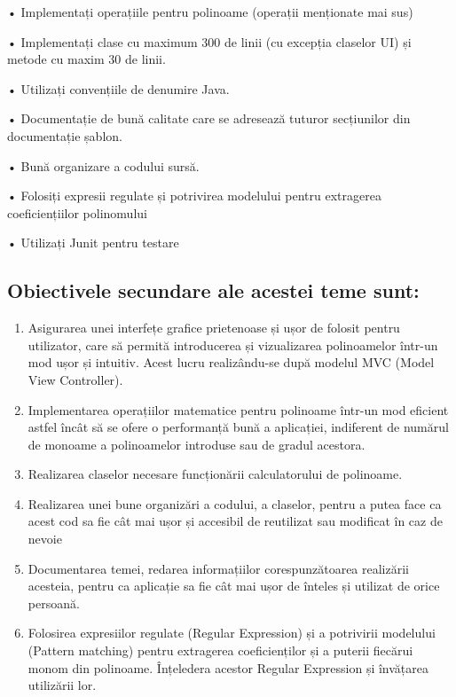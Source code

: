 \documentclass[a4paper,12pt]{article}
\begin{document}
• Implementați operațiile pentru polinoame (operații menționate mai sus)

• Implementați clase cu maximum 300 de linii (cu excepția claselor UI) și metode cu maxim 30 de linii.

• Utilizați convențiile de denumire Java.

• Documentație de bună calitate care se adresează tuturor secțiunilor din documentație șablon.

• Bună organizare a codului sursă.

• Folosiți expresii regulate și potrivirea modelului pentru extragerea coeficiențiilor polinomului

• Utilizați Junit pentru testare

\subsection{Obiectivele secundare ale acestei teme sunt:}

\begin{enumerate}
        \item Asigurarea unei interfețe grafice prietenoase și ușor de folosit pentru utilizator, care să permită introducerea și vizualizarea polinoamelor într-un mod ușor și intuitiv. Acest lucru realizându-se după modelul MVC (Model View Controller).
        \item Implementarea operațiilor matematice pentru polinoame într-un mod eficient astfel încât să se ofere o performanță bună a aplicației, indiferent de numărul de monoame a polinoamelor introduse sau de gradul acestora.
        \item Realizarea claselor necesare funcționării calculatorului de polinoame. 
        \item Realizarea unei bune organizări a codului, a claselor, pentru a putea face ca acest cod sa fie cât mai ușor și accesibil de reutilizat sau modificat în caz de nevoie
        \item Documentarea temei, redarea informațiilor corespunzătoarea realizării acesteia, pentru ca aplicație sa fie cât mai ușor de înteles și utilizat de orice persoană.
        \item Folosirea expresiilor regulate (Regular Expression) și a potrivirii modelului (Pattern matching) pentru extragerea coeficienților și a puterii fiecărui monom din polinoame. Înțeledera acestor Regular Expression și învățarea utilizării lor.
\end{enumerate}
\vspace{0.5 cm}
\end{document}
